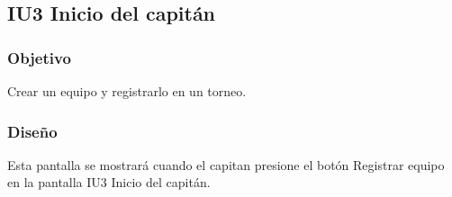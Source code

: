 
\subsection{IU3 Inicio del capitán}

\subsubsection{Objetivo}
	Crear un equipo y registrarlo en un torneo.

\subsubsection{Diseño}
	Esta pantalla se mostrará cuando el capitan presione el botón Registrar equipo en la pantalla IU3 Inicio del capitán.

